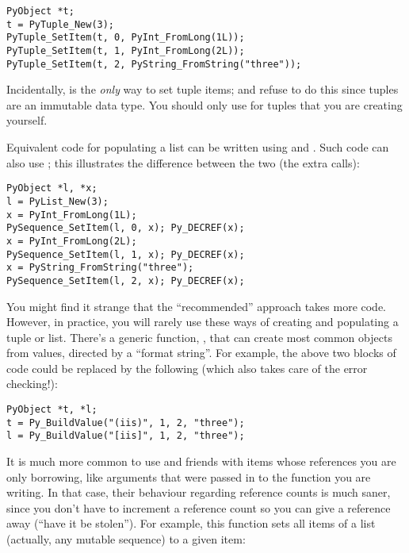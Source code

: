 \documentclass[twoside,openright]{report}
\begin{document}
\begin{verbatim}
PyObject *t;
t = PyTuple_New(3);
PyTuple_SetItem(t, 0, PyInt_FromLong(1L));
PyTuple_SetItem(t, 1, PyInt_FromLong(2L));
PyTuple_SetItem(t, 2, PyString_FromString("three"));
\end{verbatim}

Incidentally,  is the \emph{only} way to set
tuple items;  and 
refuse to do this since tuples are an immutable data type.  You should
only use  for tuples that you are creating
yourself.

Equivalent code for populating a list can be written using 
 and .  Such code can also 
use ; this illustrates the difference 
between the two (the extra  calls):

\begin{verbatim}
PyObject *l, *x;
l = PyList_New(3);
x = PyInt_FromLong(1L);
PySequence_SetItem(l, 0, x); Py_DECREF(x);
x = PyInt_FromLong(2L);
PySequence_SetItem(l, 1, x); Py_DECREF(x);
x = PyString_FromString("three");
PySequence_SetItem(l, 2, x); Py_DECREF(x);
\end{verbatim}

You might find it strange that the ``recommended'' approach takes more
code.  However, in practice, you will rarely use these ways of
creating and populating a tuple or list.  There's a generic function,
, that can create most common objects from \C{}
values, directed by a ``format string''.  For example, the above two 
blocks of code could be replaced by the following (which also takes 
care of the error checking!):

\begin{verbatim}
PyObject *t, *l;
t = Py_BuildValue("(iis)", 1, 2, "three");
l = Py_BuildValue("[iis]", 1, 2, "three");
\end{verbatim}

It is much more common to use  and friends 
with items whose references you are only borrowing, like arguments 
that were passed in to the function you are writing.  In that case, 
their behaviour regarding reference counts is much saner, since you 
don't have to increment a reference count so you can give a reference 
away (``have it be stolen'').  For example, this function sets all 
items of a list (actually, any mutable sequence) to a given item:
\end{document}
